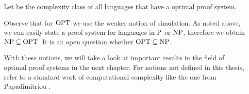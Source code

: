   \begin{definition}
    Let  be the complexity class of all languages that have a optimal proof system.
  \end{definition}

  Observe that for \(\OPT\) we use the weaker notion of simulation. As noted above, we can easily state a proof system for languages in \(\P\) or \(\NP\), therefore we obtain \(\NP \subseteq \OPT\). It is an open question whether \(\OPT \subseteq \NP\). 

  With these notions, we will take a look at important results in the field of optimal proof systems in the next chapter. For notions not defined in this thesis, refer to a standard work of computational complexity like the one from Papadimitriou \cite{Pap94}.

